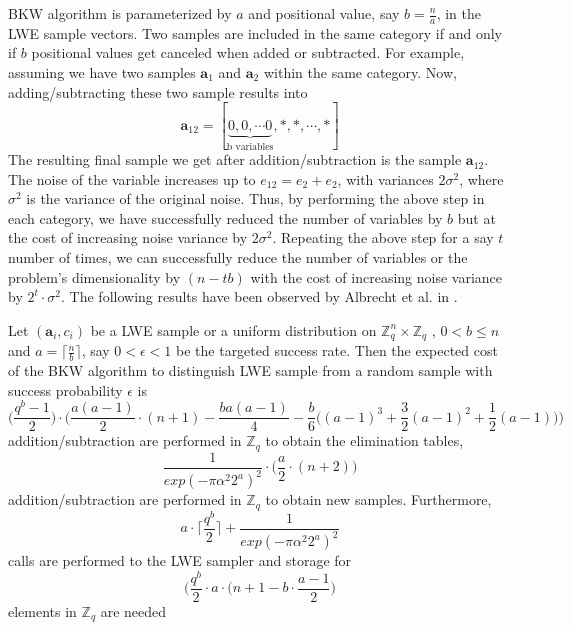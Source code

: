 BKW algorithm is parameterized by $a$ and positional value, say $b=\frac{n}{a}$, in the LWE sample vectors. Two samples are included in the same category if and only if $b$ positional values get canceled when added or subtracted. For example, assuming we have two samples $\textbf{a}_1$ and $\textbf{a}_2$ within the same category. Now, adding/subtracting these two sample results into
\begin{equation*}
    \textbf{a}_{12}=[\underbrace{0,0, \cdots 0}_\text{b variables},*, *,\cdots, *]
\end{equation*}
The resulting final sample we get after addition/subtraction is the sample $\textbf{a}_{12}$. The noise of the variable increases up to $e_{12}=e_{2}+e_{2}$, with variances $2\sigma^2$, where $\sigma^2$ is the variance of the original noise. Thus, by performing the above step in each category, we have successfully reduced the number of variables by $b$  but at the cost of increasing noise variance by $2\sigma^2$. Repeating the above step for a say $t$ number of times, we can successfully reduce the number of variables or the problem's dimensionality by $(n-tb)$ with the cost of increasing noise variance by $2^t\cdot \sigma^2$. The following results have been observed by Albrecht et al. in \cite{albrecht2014algebraic}.

\begin{theorem} \cite{albrecht2014algebraic,c54b603f579b48a08b698bde47b71455}
    Let $(\textbf{a}_i , c_i)$ be a LWE sample or a uniform distribution on $\mathbb{Z}_q^n \times \mathbb{Z}_q$ , $0 < b \leq n$ and $a =\lceil\frac{n}{b}\rceil$, say $0<\epsilon<1$ be the targeted success rate. Then the expected cost of the BKW algorithm to distinguish LWE sample from a random sample with success probability $\epsilon$ is
    \begin{equation*}
        \Big(\frac{q^b-1}{2}\Big) \cdot \Big(\frac{a(a-1)}{2}\cdot(n+1)-\frac{ba(a-1)}{4}-\frac{b}{6} \Big((a-1)^3+\frac{3}{2}(a-1)^2+\frac{1}{2}(a-1)\Big)\Big)
    \end{equation*}
    addition/subtraction are performed in $\mathbb{Z}_q$ to obtain the elimination tables,
    \begin{equation*}
        \frac{1}{exp(-\pi\alpha^2 2^{a})^2} \cdot\Big(\frac{a}{2}\cdot(n+2)\Big)
    \end{equation*}
    addition/subtraction are performed in $\mathbb{Z}_q$ to obtain new samples. Furthermore,
    \begin{equation*}
        a\cdot \Big\lceil \frac{q^b}{2} \Big\rceil + \frac{1}{exp(-\pi \alpha^2 2^a)^2}
    \end{equation*}
    calls are performed to the LWE sampler and storage for
    \begin{equation*}
        \Big( \frac{q^b}{2} \cdot a \cdot \Big( n+1-b\cdot \frac{a-1}{2} \Big)
    \end{equation*}
    elements in $\mathbb{Z}_q$ are needed
\end{theorem}




